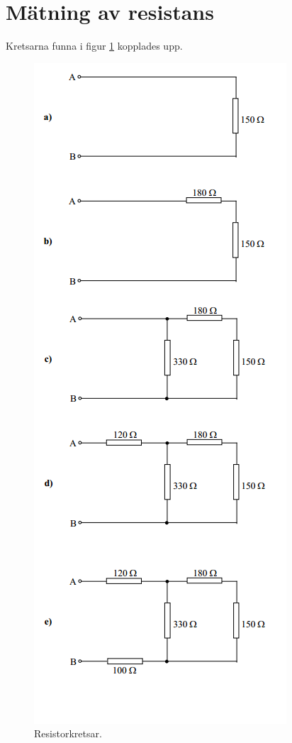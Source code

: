 \documentclass[11pt,a4paper]{article}
\begin{document}
\section{Mätning av resistans}\label{}
Kretsarna funna i figur \ref{fig:4-mm-schem} kopplades upp.

\begin{figure}[htbp]
    \centering
        \includegraphics[scale=0.9]{misc/krets4.png}
    \caption{Resistorkretsar.}
    \label{fig:4-mm-schem}
\end{figure}
\end{document}
